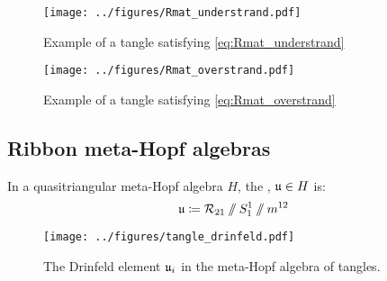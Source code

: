 \documentclass{beamer}
\begin{document}
\begin{frame}
        \begin{figure}
                \centering
                \texttt{[image: ../figures/Rmat\_understrand.pdf]}
                \caption{Example of a tangle satisfying \cref{eq:Rmat_understrand}}
                \label{fig:Rmat_understrand}
        \end{figure}
\end{frame}

\begin{frame}
        \begin{figure}
                \centering
                \texttt{[image: ../figures/Rmat\_overstrand.pdf]}
                \caption{Example of a tangle satisfying \cref{eq:Rmat_overstrand}}
                \label{fig:Rmat_overstrand}
        \end{figure}
\end{frame}

\subsection{Ribbon meta-Hopf algebras}

\begin{frame}
        \begin{definition}
                In a quasitriangular meta-Hopf algebra $H$, the , $\mathfrak{u} \in H$ is:
                \begin{equation}
                        \mathfrak{u} \coloneq \mathcal{R}_{21}\mathbin{/\mkern-6mu/}S^1_1 \mathbin{/\mkern-6mu/} m^{12}
                \end{equation}
        \end{definition}
        \pause
        \begin{figure}
                \centering
                \texttt{[image: ../figures/tangle\_drinfeld.pdf]}
                \caption{The Drinfeld element $\mathfrak{u}_i$ in the meta-Hopf algebra of
                tangles.}
                \label{fig:tangle_drinfeld}
        \end{figure}
\end{frame}
\end{document}
